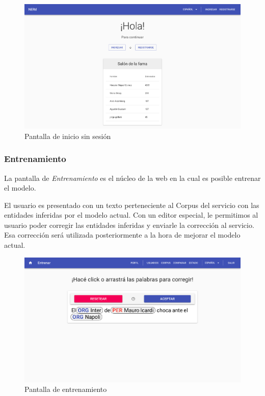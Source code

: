 \documentclass[12pt,a4paper,]{scrartcl}
\begin{document}
\begin{figure}[H]

{\centering \includegraphics{assets/logic/home-anonymous.pdf} 

}

\caption{Pantalla de inicio sin sesión}\label{fig:logic-home-anonymous}
\end{figure}

\hypertarget{entrenamiento}{%
\subsubsection{Entrenamiento}\label{entrenamiento}}

La pantalla de \emph{Entrenamiento} es el núcleo de la web en la cual es posible entrenar el modelo.

El usuario es presentado con un texto perteneciente al Corpus del servicio con las entidades inferidas por el modelo actual. Con un editor especial, le permitimos al usuario poder corregir las entidades inferidas y enviarle la corrección al servicio. Esa corrección será utilizada posteriormente a la hora de mejorar el modelo actual.

\begin{figure}[H]

{\centering \includegraphics{assets/logic/train.pdf} 

}

\caption{Pantalla de entrenamiento}\label{fig:logic-train}
\end{figure}
\end{document}
